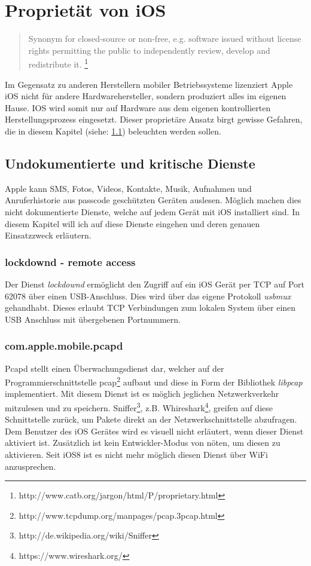 \section{Proprietät von iOS}
	\begin{quote}
		Synonym for closed-source or non-free, e.g. software issued without license
		rights permitting the public to independently review, develop and redistribute it.
		\footnote{http://www.catb.org/jargon/html/P/proprietary.html}
	\end{quote}
	Im Gegensatz zu anderen Herstellern mobiler Betriebssysteme lizenziert Apple
	iOS nicht für andere Hardwarehersteller, sondern produziert alles im
	eigenen Hause. IOS wird somit nur auf Hardware aus dem eigenen kontrollierten
	Herstellungsprozess eingesetzt. Dieser proprietäre Ansatz birgt gewisse
	Gefahren, die in diesem Kapitel (siehe: \ref{sec:undocumented-services})
	beleuchten werden sollen.
	\subsection{Undokumentierte und kritische
	Dienste}\label{sec:undocumented-services}
		Apple kann SMS, Fotos, Videos, Kontakte, Musik, Aufnahmen und Anruferhistorie
		aus passcode geschützten Geräten auslesen. Möglich machen dies nicht
		dokumentierte Dienste, welche auf jedem Gerät mit iOS installiert sind. In
		diesem Kapitel will ich auf diese Dienste eingehen und deren genauen
		Einsatzzweck erläutern.
		\subsubsection{lockdownd - remote access}
			Der Dienst \textsl{lockdownd} ermöglicht den Zugriff auf ein iOS Gerät
			per TCP auf Port 62078 über einen USB-Anschluss. Dies wird über das eigene
			Protokoll \textsl{usbmux} gehandhabt. Dieses erlaubt TCP Verbindungen zum
			lokalen System über einen USB Anschluss mit übergebenen	Portnummern.
		\subsubsection{com.apple.mobile.pcapd}
			Pcapd stellt einen Überwachungsdienst dar, welcher auf der
			Programmierschnittstelle
			pcap\footnote{http://www.tcpdump.org/manpages/pcap.3pcap.html} aufbaut und
			diese in Form der Bibliothek \textsl{libpcap} implementiert. Mit diesem
			Dienst ist es möglich jeglichen Netzwerkverkehr mitzulesen und zu speichern.
			Sniffer\footnote{http://de.wikipedia.org/wiki/Sniffer}, z.B.
			Whireshark\footnote{https://www.wireshark.org/}, greifen auf diese
			Schnittstelle zurück, um Pakete direkt an der Netzwerkschnittstelle
			abzufragen. Dem Benutzer des iOS Gerätes wird es visuell nicht erläutert,
			wenn dieser Dienst aktiviert ist. Zusätzlich ist kein Entwickler-Modus von
			nöten, um diesen zu aktivieren. Seit iOS8 ist es nicht mehr möglich diesen
			Dienst über WiFi anzusprechen.
